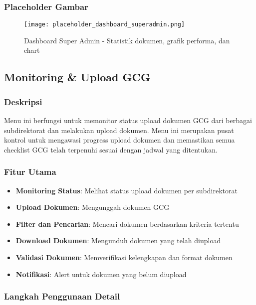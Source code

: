 \documentclass[12pt,a4paper]{article}
\begin{document}
\subsubsection{Placeholder Gambar}
\begin{figure}[H]
\centering
\texttt{[image: placeholder\_dashboard\_superadmin.png]}
\caption{Dashboard Super Admin - Statistik dokumen, grafik performa, dan chart}
\label{fig:dashboard_superadmin}
\end{figure}

\subsection{Monitoring \& Upload GCG}

\subsubsection{Deskripsi}
Menu ini berfungsi untuk memonitor status upload dokumen GCG dari berbagai subdirektorat dan melakukan upload dokumen. Menu ini merupakan pusat kontrol untuk mengawasi progress upload dokumen dan memastikan semua checklist GCG telah terpenuhi sesuai dengan jadwal yang ditentukan.

\subsubsection{Fitur Utama}
\begin{itemize}
\item \textbf{Monitoring Status}: Melihat status upload dokumen per subdirektorat
\item \textbf{Upload Dokumen}: Mengunggah dokumen GCG
\item \textbf{Filter dan Pencarian}: Mencari dokumen berdasarkan kriteria tertentu
\item \textbf{Download Dokumen}: Mengunduh dokumen yang telah diupload
\item \textbf{Validasi Dokumen}: Memverifikasi kelengkapan dan format dokumen
\item \textbf{Notifikasi}: Alert untuk dokumen yang belum diupload
\end{itemize}

\subsubsection{Langkah Penggunaan Detail}
\end{document}

